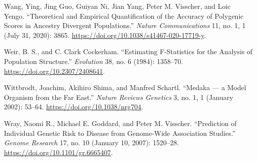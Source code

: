 \documentclass[
  9pt,
]{book}
\newlength{\cslhangindent}
\newlength{\cslentryspacingunit} %
\newenvironment{CSLReferences}[2] %
 {%
  \setlength{\parindent}{0pt}
  \ifodd #1
  \let\oldpar\par
  \def\par{\hangindent=\cslhangindent\oldpar}
  \fi
  \setlength{\parskip}{#2\cslentryspacingunit}
 }%
 {}
\begin{document}
\begin{CSLReferences}{1}{0}
\leavevmode{}%
Wang, Ying, Jing Guo, Guiyan Ni, Jian Yang, Peter M. Visscher, and Loic Yengo. {``Theoretical and Empirical Quantification of the Accuracy of Polygenic Scores in Ancestry Divergent Populations.''} \emph{Nature Communications} 11, no. 1, 1 (July 31, 2020): 3865. \url{https://doi.org/10.1038/s41467-020-17719-y}.

\leavevmode{}%
Weir, B. S., and C. Clark Cockerham. {``Estimating {F-Statistics} for the {Analysis} of {Population Structure}.''} \emph{Evolution} 38, no. 6 (1984): 1358--70. \url{https://doi.org/10.2307/2408641}.

\leavevmode{}%
Wittbrodt, Joachim, Akihiro Shima, and Manfred Schartl. {``Medaka --- a Model Organism from the Far East.''} \emph{Nature Reviews Genetics} 3, no. 1, 1 (January 2002): 53--64. \url{https://doi.org/10.1038/nrg704}.

\leavevmode{}%
Wray, Naomi R., Michael E. Goddard, and Peter M. Visscher. {``Prediction of Individual Genetic Risk to Disease from Genome-Wide Association Studies.''} \emph{Genome Research} 17, no. 10 (January 10, 2007): 1520--28. \url{https://doi.org/10.1101/gr.6665407}.

\end{CSLReferences}
\end{document}
